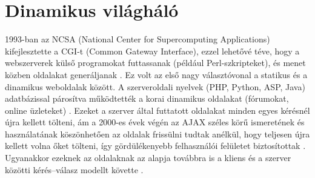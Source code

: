 \section{Dinamikus világháló}
1993-ban az NCSA (National Center for Supercomputing Applications) kifejlesztette a CGI-t (Common Gateway Interface), ezzel lehetővé téve, hogy a webszerverek külső programokat futtassanak (például Perl-szkripteket), és menet közben oldalakat generáljanak \cite{robinson2004cgi}. Ez volt az első nagy választóvonal a statikus és a dinamikus weboldalak között. A szerveroldali nyelvek (PHP, Python, ASP, Java) adatbázissal párosítva működtették a korai dinamikus oldalakat (fórumokat, online üzleteket) \cite{mdnServerSideIntro,mdnWebStandardsModel}. Ezeket a szerver által futtatott oldalakat minden egyes kérésnél újra kellett tölteni, ám a 2000-es évek végén az AJAX széles körű ismeretének és használatának köszönhetően az oldalak frissülni tudtak anélkül, hogy teljesen újra kellett volna őket tölteni, így gördülékenyebb felhasználói felületet biztosítottak \cite{garrett2005ajax,mdnAjax}. Ugyanakkor ezeknek az oldalaknak az alapja továbbra is a kliens és a szerver közötti kérés–válasz modellt követte \cite{fielding2022httpSemantics}.
